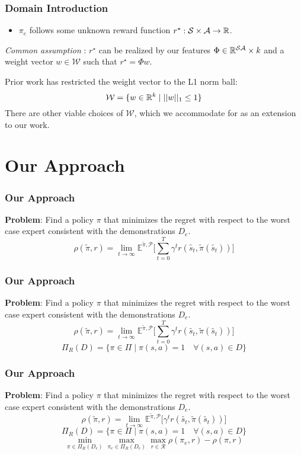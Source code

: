 \documentclass{beamer}
\begin{document}
\begin{frame}
	\frametitle{Domain Introduction}
\begin{itemize}
	\item $\pi_e$ follows some unknown reward function $r^\star : \mathcal{S} \times \mathcal{A} \to \mathbb{R}$.
\end{itemize}
	\emph{Common assumption} : $r^\star$ can be realized by our features $\Phi \in \mathbb{R}^{\mathcal{S}\mathcal{A}} \times k$
	and a weight vector $w \in \mathcal{W}$ such that $r^\star = \Phi w$.

	Prior work has restricted the weight vector to the L1 norm ball:
	\[ \mathcal{W} = \lbrace w \in \mathbb{R}^k \mid \lvert \lvert w \rvert \rvert_1 \leq 1 \rbrace \]
	There are other viable choices of $\mathcal{W}$, which we accommodate for as an extension to our work.
\end{frame}


\section*{Our Approach}

\begin{frame}
	\frametitle{Our Approach}
	\textbf{Problem}: Find a policy $\pi$ that minimizes the regret with respect to the worst case expert consistent with the demonstrations $D_e$.
	\[ \rho(\tilde{\pi}, r) = \lim_{t \to \infty} \mathbb{E}^{\tilde{\pi}, \mathcal{P}} \lbrack \sum_{t=0}^T \gamma^t r(\tilde{s_t}, \tilde{\pi}(\tilde{s_t})) \rbrack \]
\end{frame}

\begin{frame}
	\frametitle{Our Approach}
	\textbf{Problem}: Find a policy $\pi$ that minimizes the regret with respect to the worst case expert consistent with the demonstrations $D_e$.
	\[ \rho(\tilde{\pi}, r) = \lim_{t \to \infty} \mathbb{E}^{\tilde{\pi}, \mathcal{P}} \lbrack \sum_{t=0}^T \gamma^t r(\tilde{s_t}, \tilde{\pi}(\tilde{s_t})) \rbrack \]
	\[ \Pi_R(D) = \lbrace \pi \in \Pi \mid \pi(s,a) = 1 \quad \forall (s,a) \in D \rbrace \]
\end{frame}


\begin{frame}
	\frametitle{Our Approach}
	\textbf{Problem}: Find a policy $\pi$ that minimizes the regret with respect to the worst case expert consistent with the demonstrations $D_e$.
	\[ \rho(\tilde{\pi}, r) = \lim_{t \to \infty} \mathbb{E}^{\tilde{\pi}, \mathcal{P}} \lbrack \gamma^t r(\tilde{s_t}, \tilde{\pi}(\tilde{s_t})) \rbrack \]
	\[ \Pi_R(D) = \lbrace \pi \in \Pi \mid \pi(s,a) = 1 \quad \forall (s,a) \in D \rbrace \]
	\[ \min_{\pi \in \Pi_R(D_e)} \max_{\pi_e \in \Pi_R(D_e)} \max_{r \in \mathcal{R}} \rho(\pi_e, r) - \rho(\pi, r)\]
\end{frame}
\end{document}
